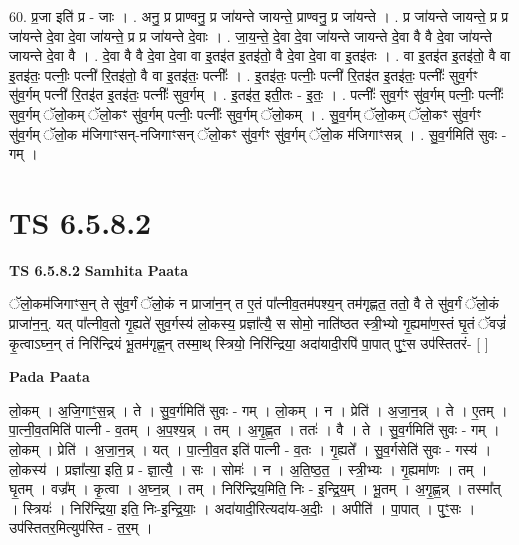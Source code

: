 \documentclass[17pt]{extarticle}
\begin{document}
60. प्र॒जा इति॑ प्र - जाः । . अनु॒ प्र प्राण्वनु॒ प्र जा॑यन्ते जायन्ते॒ प्राण्वनु॒ प्र जा॑यन्ते । . प्र जा॑यन्ते जायन्ते॒ प्र प्र जा॑यन्ते दे॒वा दे॒वा जा॑यन्ते॒ प्र प्र जा॑यन्ते दे॒वाः । . जा॒य॒न्ते॒ दे॒वा दे॒वा जा॑यन्ते जायन्ते दे॒वा वै वै दे॒वा जा॑यन्ते जायन्ते दे॒वा वै । . दे॒वा वै वै दे॒वा दे॒वा वा इ॒त‌इ॑त इ॒त‌इ॑तो॒ वै दे॒वा दे॒वा वा इ॒त‌इ॑तः । . वा इ॒त‌इ॑त इ॒त‌इ॑तो॒ वै वा इ॒त‌इ॑तः॒ पत्नीः॒ पत्नी॑ रि॒त‌इ॑तो॒ वै वा इ॒त‌इ॑तः॒ पत्नीः᳚ । . इ॒त‌इ॑तः॒ पत्नीः॒ पत्नी॑ रि॒त‌इ॑त इ॒त‌इ॑तः॒ पत्नीः᳚ सुव॒र्गꣳ सु॑व॒र्गम् पत्नी॑ रि॒त‌इ॑त इ॒त‌इ॑तः॒ पत्नीः᳚ सुव॒र्गम् । . इ॒त‌इ॑त॒ इती॒तः - इ॒तः॒ । . पत्नीः᳚ सुव॒र्गꣳ सु॑व॒र्गम् पत्नीः॒ पत्नीः᳚ सुव॒र्गम् ॅलो॒कम् ॅलो॒कꣳ सु॑व॒र्गम् पत्नीः॒ पत्नीः᳚ सुव॒र्गम् ॅलो॒कम् । . सु॒व॒र्गम् ॅलो॒कम् ॅलो॒कꣳ सु॑व॒र्गꣳ सु॑व॒र्गम् ॅलो॒क म॑जिगाꣳसन्-नजिगाꣳसन् ॅलो॒कꣳ सु॑व॒र्गꣳ सु॑व॒र्गम् ॅलो॒क म॑जिगाꣳसन्न् । . सु॒व॒र्गमिति॑ सुवः - गम् । \newline
\pagebreak
{}

\section{ TS 6.5.8.2 }

\textbf{TS 6.5.8.2 } \newline
\textbf{Samhita Paata} \newline

ॅलो॒कम॑जिगाꣳस॒न् ते सु॑व॒र्गं ॅलो॒कं न प्राजा॑न॒न् त ए॒तं पा᳚त्नीव॒तम॑पश्य॒न् तम॑गृह्णत॒ ततो॒ वै ते सु॑व॒र्गं ॅलो॒कं प्राजा॑न॒न्॒. यत् पा᳚त्नीव॒तो गृ॒ह्यते॑ सुव॒र्गस्य॑ लो॒कस्य॒ प्रज्ञा᳚त्यै॒ स सोमो॒ नाति॑ष्ठत स्त्री॒भ्यो गृ॒ह्यमा॑ण॒स्तं घृ॒तं ॅवज्रं॑ कृ॒त्वाऽघ्न॒न् तं निरि॑न्द्रियं भू॒तम॑गृह्ण॒न् तस्मा॒थ् स्त्रियो॒ निरि॑न्द्रिया॒ अदा॑यादी॒रपि॑ पा॒पात् पुꣳ॒॒स उप॑स्तितरं- [  ] \newline

\textbf{Pada Paata} \newline

लो॒कम् । अ॒जि॒गाꣳ॒॒स॒न्न् । ते । सु॒व॒र्गमिति॑ सुवः - गम् । लो॒कम् । न । प्रेति॑ । अ॒जा॒न॒न्न् । ते । ए॒तम् । पा॒त्नी॒व॒तमिति॑ पात्नी - व॒तम् । अ॒प॒श्य॒न्न् । तम् । अ॒गृ॒ह्ण॒त । ततः॑ । वै । ते । सु॒व॒र्गमिति॑ सुवः - गम् । लो॒कम् । प्रेति॑ । अ॒जा॒न॒न्न् । यत् । पा॒त्नी॒व॒त इति॑ पात्नी - व॒तः । गृ॒ह्यते᳚ । सु॒व॒र्गसेति॑ सुवः - गस्य॑ । लो॒कस्य॑ । प्रज्ञा᳚त्या॒ इति॒ प्र - ज्ञा॒त्यै॒ । सः । सोमः॑ । न । अ॒ति॒ष्ठ॒त॒ । स्त्री॒भ्यः । गृ॒ह्यमा॑णः । तम् । घृ॒तम् । वज्र᳚म् । कृ॒त्वा । अ॒घ्न॒न्न् । तम् । निरि॑न्द्रिय॒मिति॒ निः - इ॒न्द्रि॒य॒म् । भू॒तम् । अ॒गृ॒ह्ण॒न्न् । तस्मा᳚त् । स्त्रियः॑ । निरि॑न्द्रिया॒ इति॒ निः-इ॒न्द्रि॒याः॒ । अदा॑यादी॒रित्यदा॑य-अ॒दीः॒ । अपीति॑ । पा॒पात् । पुꣳ॒॒सः । उप॑स्तितर॒मित्युप॑स्ति - त॒र॒म् ।  \newline
\end{document}
